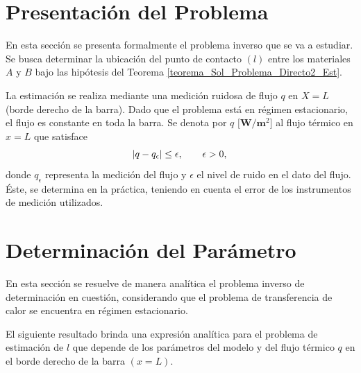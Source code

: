 \section{Presentaci\'on del Problema} \label{sec:Pres_Problema7}

En esta secci\'on se presenta formalmente el problema inverso que se va a estudiar. Se busca determinar la ubicaci\'on del punto de contacto 
$(l)$ entre los materiales $A$ y $B$ bajo las hip\'otesis del Teorema \ref{teorema_Sol_Problema_Directo2_Est}.

La estimaci\'on se realiza mediante una medici\'on ruidosa de flujo $q$ en $X=L$ (borde derecho de la barra). Dado que el problema est\'a en r\'egimen estacionario, el flujo es constante en toda la barra. Se denota por $q$ $\textbf{[W/m{$^{2}$}]}$ al flujo t\'ermico en $x=L$ que satisface 
%
\begin{equation}
\label{Ec_Ruido_en_el_flujo}
\left |q-q_\epsilon \right | \leq \epsilon, \qquad  \epsilon >0 , \\
\end{equation}
%
donde $q_\epsilon$ representa la medici\'on del flujo y $\epsilon$ el nivel de ruido en el dato del flujo. \'Este, se determina en la pr\'actica, teniendo en cuenta el error de los instrumentos de medici\'on utilizados. 


\section{Determinaci\'on del Par\'ametro} \label{sec:Aprox_l}

En esta secci\'on se resuelve de manera anal\'itica el problema inverso de determinaci\'on en cuesti\'on, considerando que el problema de transferencia de calor se encuentra en r\'egimen estacionario. 

El siguiente resultado brinda una expresi\'on anal\'itica para el problema de estimaci\'on de $l$ que depende de los par\'ametros del modelo
y del flujo t\'ermico $q$ en el borde derecho de la barra $(x=L)$.

